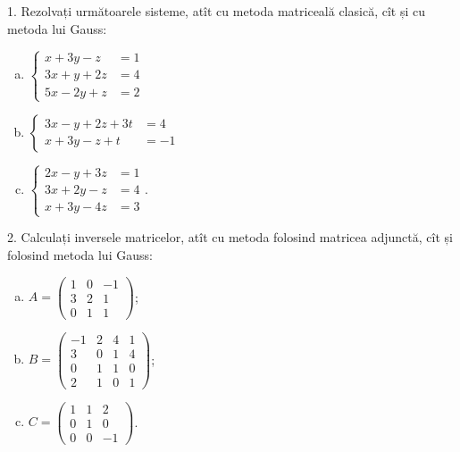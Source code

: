 1. Rezolvați următoarele sisteme, atît cu metoda matriceală clasică, cît și cu
metoda lui Gauss:
\begin{enumerate}[(a)]
\item $ \begin{cases}
    x + 3y - z &= 1 \\
    3x + y + 2z &= 4 \\
    5x - 2y + z &= 2
  \end{cases} $
\item $ \begin{cases}
    3x - y + 2z + 3t &= 4 \\
    x + 3y - z + t &= -1
  \end{cases} $
\item $ \begin{cases}
    2x - y + 3z &= 1 \\
    3x + 2y - z &= 4 \\
    x + 3y - 4z &= 3
  \end{cases} $.
\end{enumerate}

\vspace{1cm}

2. Calculați inversele matricelor, atît cu metoda folosind matricea adjunctă,
cît și folosind metoda lui Gauss:
\begin{enumerate}[(a)]
\item $ A =
  \begin{pmatrix}
1 & 0 & -1 \\
3 & 2 & 1 \\
0 & 1 & 1
\end{pmatrix} $;
\item $ B =
  \begin{pmatrix}
    -1 & 2 & 4 & 1 \\
    3 & 0 & 1 & 4 \\
    0 & 1 & 1 & 0 \\
    2 & 1 & 0 & 1
  \end{pmatrix} $;
\item $ C =
  \begin{pmatrix}
    1 & 1 & 2 \\
    0 & 1 & 0 \\
    0 & 0 & -1
  \end{pmatrix} $.
\end{enumerate}


